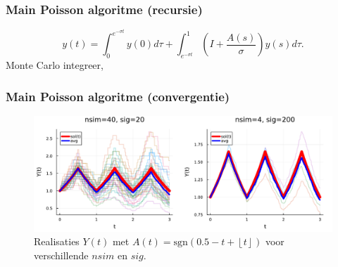 \documentclass[18pt,aspectratio=149]{beamer}
\begin{document}
\begin{frame}
    \frametitle{Main Poisson algoritme (recursie)}

    \begin{equation} \label{eq:poisson main 2}
        y(t) = \int_{0}^{e^{-\sigma t}}  y(0) d\tau
        + \int_{e^{-\sigma t}}^{1} \left(I+   \frac{A(s)}{\sigma} \right)  y(s) d\tau.
    \end{equation}
    Monte Carlo integreer,  \\
    \action<+->{}
\end{frame}


\begin{frame}
    \frametitle{Main Poisson algoritme (convergentie)}
    \begin{figure}[h!]
        \centering
        \includegraphics[width=\textwidth]{imgs/convergence_main_poisson.pdf}
        \caption{
            Realisaties $Y(t)$ met $A(t) = \text{sgn}\left(0.5-t+\left\lfloor t \right\rfloor \right)$ voor verschillende $nsim$ en $sig$.
        }
        \label{fig:imgs/main poisson convergentie}
    \end{figure}
\end{frame}
\end{document}
